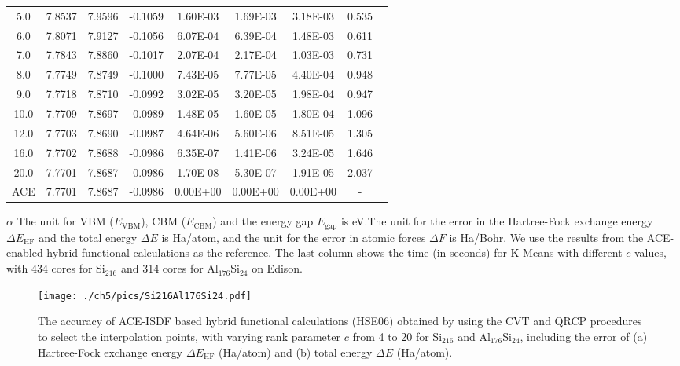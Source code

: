 \begin{table}[htbp]
\begin{threeparttable}
\begin{tabular}{cccccccc}
			 5.0 & 7.8537 & 7.9596 & -0.1059 &  1.60E-03 &  1.69E-03 &  3.18E-03 &  0.535 \ \\
			 6.0 & 7.8071 & 7.9127 & -0.1056 &  6.07E-04 &  6.39E-04 &  1.48E-03 &  0.611 \ \\
			 7.0 & 7.7843 & 7.8860 & -0.1017 &  2.07E-04 &  2.17E-04 &  1.03E-03 &  0.731 \ \\
			 8.0 & 7.7749 & 7.8749 & -0.1000 &  7.43E-05 &  7.77E-05 &  4.40E-04 &  0.948 \ \\
			 9.0 & 7.7718 & 7.8710 & -0.0992 &  3.02E-05 &  3.20E-05 &  1.98E-04 &  0.947 \ \\
			10.0 & 7.7709 & 7.8697 & -0.0989 &  1.48E-05 &  1.60E-05 &  1.80E-04 &  1.096 \ \\
			12.0 & 7.7703 & 7.8690 & -0.0987 &  4.64E-06 &  5.60E-06 &  8.51E-05 &  1.305 \ \\
			16.0 & 7.7702 & 7.8688 & -0.0986 &  6.35E-07 &  1.41E-06 &  3.24E-05 &  1.646 \ \\
			20.0 & 7.7701 & 7.8687 & -0.0986 &  1.70E-08 &  5.30E-07 &  1.91E-05 &  2.037 \ \\
			 ACE & 7.7701 & 7.8687 & -0.0986 &  0.00E+00 &  0.00E+00 &  0.00E+00 &  - \ \\
		\end{tabular}
		\begin{tablenotes}
			\item[$\alpha$] The unit for VBM ($E_\text{VBM}$), CBM ($E_\text{CBM}$)
			and the energy gap $E_\text{gap}$ is eV.The unit for the error in the
			Hartree-Fock exchange energy ${\Delta}E_\text{HF}$ and the total energy
			${\Delta}E$ is Ha/atom, and the unit for the error in atomic forces 
			${\Delta}F$ is Ha/Bohr. We use the results from the ACE-enabled hybrid
			functional calculations as the reference. The last column shows the time 
			(in seconds) for K-Means with different $c$ values, with 434 cores for
			Si$_{216}$ and 314 cores for Al$_{176}$Si$_{24}$ on Edison.
		\end{tablenotes}
	\end{threeparttable}
\end{table}

\begin{figure}[htbp]
	\begin{center}
		\texttt{[image: ./ch5/pics/Si216Al176Si24.pdf]}
	\end{center}
	\caption{The accuracy of ACE-ISDF based hybrid functional calculations (HSE06)
	obtained by using the CVT and QRCP procedures to select the interpolation
	points, with varying rank parameter $c$ from 4 to 20 for Si$_{216}$ and Al$_
	{176}$Si$_{24}$, including the error of (a) Hartree-Fock exchange energy $
	{\Delta}E_\text{HF}$ (Ha/atom) and (b) total energy ${\Delta}E$ (Ha/atom).} 
	\label{fig:Si216Al176Si24}
\end{figure}

